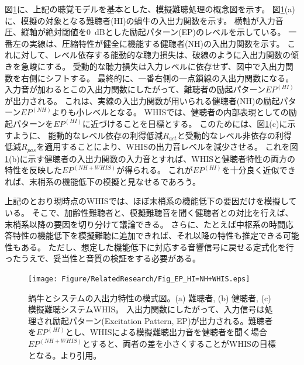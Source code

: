 図\ref{fig:EP_HI=NH+WHIS}に、上記の聴覚モデルを基本とした、模擬難聴処理の概念図を示す。
図\ref{fig:EP_HI=NH+WHIS}(a)に、模擬の対象となる難聴者(HI)の蝸牛の入出力関数を示す。
横軸が入力音圧、縦軸が絶対閾値を0~dBとした励起パターン(EP)のレベルを示している。
一番左の実線は、圧縮特性が健全に機能する健聴者(NH)の入出力関数を示す。
これに対して、レベル依存する能動的な聴力損失は、破線のように入出力関数の傾きを急峻にする。
受動的な聴力損失は入力レベルに依存せず、図中で入出力関数を右側にシフトする。
最終的に、一番右側の一点鎖線の入出力関数になる。
入力音が加わるとこの入出力関数にしたがって、難聴者の励起パターン$EP^{(HI)}$が出力される。
これは、実線の入出力関数が用いられる健聴者(NH)の励起パターン$EP^{(NH)}$よりも小レベルとなる。
WHISでは、健聴者の内部表現としての励起パターンを$EP^{(HI)}$に近づけることを目標とする。
このためには、図\ref{fig:EP_HI=NH+WHIS}(c)に示すように、
能動的なレベル依存の利得低減$R_{act}$と受動的なレベル非依存の利得低減$R_{pas}$を適用することにより、WHISの出力音レベルを減少させる。
これを図\ref{fig:EP_HI=NH+WHIS}(b)に示す健聴者の入出力関数の入力音とすれば、WHISと健聴者特性の両方の特性を反映した$EP^{(NH+WHIS)}$が得られる。
これが$EP^{(HI)}$を十分良く近似できれば、末梢系の機能低下の模擬と見なせるであろう。

上記のとおり現時点のWHISでは、ほぼ末梢系の機能低下の要因だけを模擬している。
そこで、加齢性難聴者と、模擬難聴音を聞く健聴者との対比を行えば、末梢系以降の要因を切り分けて議論できる。
さらに、たとえば中枢系の時間応答特性の機能低下を模擬難聴に追加できれば、それ以降の特性も推定できる可能性もある。
ただし、想定した機能低下に対応する音響信号に戻せる定式化を行ったうえで、妥当性と音質の検証をする必要がある。


\begin{figure}[t]
   \centerline{\texttt{[image: Figure/RelatedResearch/Fig\_EP\_HI=NH+WHIS.eps]}}
   \vspace{0pt}
   \caption{蝸牛とシステムの入出力特性の模式図。(a) 難聴者, (b) 健聴者, (c) 模擬難聴システムWHIS。
   入出力関数にしたがって、入力信号は処理され励起パターン(Excitation Pattern, EP)が出力される。難聴者を$EP^{(HI)}$とし、WHISによる模擬難聴出力音を健聴者を聞く場合$EP^{(NH+WHIS)}$とすると、両者の差を小さくすることがWHISの目標となる。\cite{irino2023hearing}より引用。
 }
 \vspace{-15pt}
 \label{fig:EP_HI=NH+WHIS}
 \end{figure}




